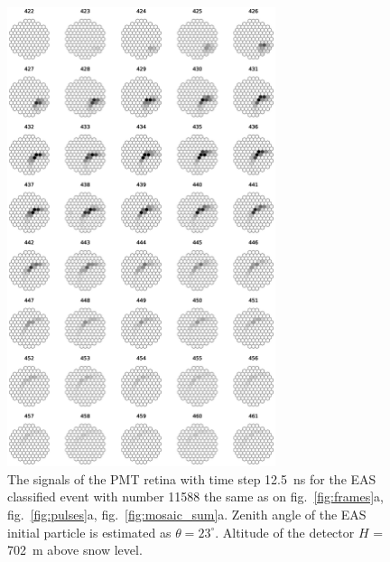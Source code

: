 \documentclass[final,5p,times,twocolumn]{elsarticle}
\begin{document}
\begin{figure}[pt]
    \centering
    \includegraphics[width=0.7\textwidth]{figs/retina_11588_lin.eps}%
    \caption{The signals of the PMT retina with time step 12.5~ns for the EAS classified event with number 11588 the same as on fig.~\ref{fig:frames}a, fig.~\ref{fig:pulses}a, fig.~\ref{fig:mosaic_sum}a. Zenith angle of the EAS initial particle is estimated as $\theta = 23^{\circ}$. Altitude of the detector $H$ = 702~m above snow level.
    }
    \label{fig:retina_eas}
\end{figure}
\end{document}
